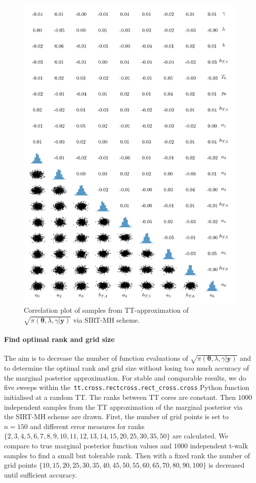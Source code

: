 \begin{figure}%
	\includegraphics[]{2ndCorrPlot.png}
	\caption*{Correlation plot of samples from TT-approximation of $\sqrt{\pi(\bm{\theta},\lambda,\gamma | \bm{y})}$ via SIRT-MH scheme.}
\end{figure}



\paragraph{Find optimal rank and grid size}
The aim is to decrease the number of function evaluations of $\sqrt{\pi( \bm{\theta},\lambda,\gamma  | \bm{y})}$ and to determine the optimal rank and grid size without losing too much accuracy of the marginal posterior approximation.
For stable and comparable results, we do five sweeps within the~\texttt{tt.cross.rectcross.rect\_cross.cross} Python function initialised at a random TT.
The ranks between TT cores are constant.
Then $1000$ independent samples from the TT approximation of the marginal posterior via the SIRT-MH scheme are drawn. 
First, the number of grid points is set to $n = 150$ and different error measures for ranks $\{2,3,4,5,6,7,8,9,10,11,12,13,14,15, 20, 25, 30, 35, 50\}$ are calculated.
We compare to true marginal posterior function values and $1000$ independent t-walk samples to find a small but tolerable rank.
Then with a fixed rank the number of grid points $\{10, 15, 20, 25, 30, 35, 40, 45, 50, 55, 60, 65, 70, 80, 90, 100\}$ is decreased until sufficient accuracy.

